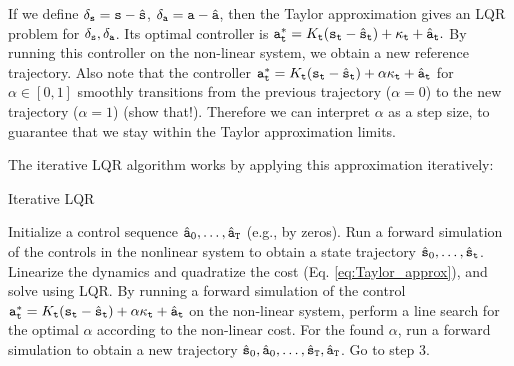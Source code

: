 If we define $\delta_{\tt s} = {\tt s} - \hat{{\tt s}}$, $\delta_{\tt a} = {\tt a} - \hat{{\tt a}}$, then the Taylor approximation gives an LQR problem for $\delta_{\tt s}, \delta_{\tt a}$. Its optimal controller is ${\tt a}_{\tt t}^* = K_{\tt t} ({\tt s}_{\tt t} - \hat{{\tt s}}_{\tt t}) + \kappa_{\tt t} + \hat{{\tt a}}_{\tt t}.$ By running this controller on the non-linear system, we obtain a new reference trajectory. 
Also note that the controller ${\tt a}_{\tt t}^* = K_{\tt t} ({\tt s}_{\tt t} - \hat{{\tt s}}_{\tt t}) + \alpha \kappa_{\tt t} + \hat{{\tt a}}_{\tt t}$ for $\alpha \in [0,1]$ smoothly transitions from the previous trajectory ($\alpha=0$) to the new trajectory ($\alpha=1$) (show that!). Therefore we can interpret $\alpha$ as a step size, to guarantee that we stay within the Taylor approximation limits.

The iterative LQR algorithm works by applying this approximation iteratively:


\begin{algorithm}
\caption{Iterative LQR}
\label{alg:nonlinear_control}
\begin{algorithmic}[1]
\State Initialize a control sequence $\hat{{\tt a}}_0, \dots, \hat{{\tt a}}_{\tt T}$ (e.g., by zeros).
\State Run a forward simulation of the controls in the nonlinear system to obtain a state trajectory $\hat{{\tt s}}_0, \dots, \hat{{\tt s}}_{\tt t}$.
\State Linearize the dynamics and quadratize the cost (Eq. \ref{eq:Taylor_approx}), and solve using LQR.
\State By running a forward simulation of the control ${\tt a}_{\tt t}^* = K_{\tt t} ({\tt s}_{\tt t} - \hat{{\tt s}}_{\tt t}) + \alpha \kappa_{\tt t} + \hat{{\tt a}}_{\tt t}$ on the non-linear system, perform a line search for the optimal $\alpha$ according to the non-linear cost.
\State For the found $\alpha$, run a forward simulation to obtain a new trajectory $\hat{{\tt s}}_0, \hat{{\tt a}}_0, \dots, \hat{{\tt s}}_{{\tt T}}, \hat{{\tt a}}_{{\tt T}}$. Go to step 3.
\end{algorithmic}
\end{algorithm}

